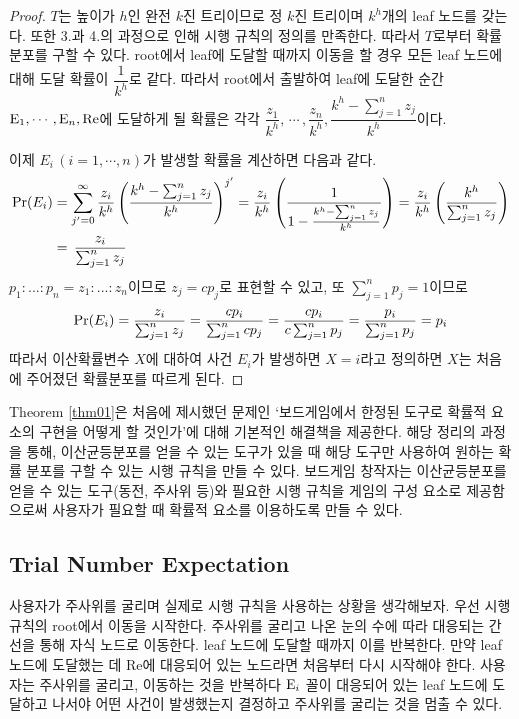 \documentclass[11pt]{article}
\begin{document}
\doublespacing
\begin{proof}
$T$는 높이가 $h$인 완전 $k$진 트리이므로 정 $k$진 트리이며 $k^{h}$개의 leaf 노드를 갖는다. 또한 3.과 4.의 과정으로 인해 시행 규칙의 정의를 만족한다. 따라서 $T$로부터 확률분포를 구할 수 있다. root에서 leaf에 도달할 때까지 이동을 할 경우 모든 leaf 노드에 대해 도달 확률이 $\dfrac{1}{k^{h}}$로 같다. 따라서 root에서 출발하여 leaf에 도달한 순간 $\textnormal{E}_1,\cdots,\textnormal{E}_n,\textnormal{Re}$에 도달하게 될 확률은 각각 $\dfrac{z_{1}}{k^{h}},\,\cdots\,,\dfrac{z_{n}}{k^{h}},\dfrac{k^{h}-\sum_{j=1}^{n}z_{j}}{k^{h}}$이다.

이제 $E_{i}\,(i=1,\cdots,n)$가 발생할 확률을 계산하면 다음과 같다.
\[
\begin{split}
\textnormal{Pr}(E_{i}) & = \sum_{j'=0}^{\infty} \frac{z_{i}}{k^{h}}\left(\frac{k^{h}-\sum_{j=1}^{n}z_{j}}{k^{h}}\right)^{j'} = \frac{z_{i}}{k^{h}}\left(\frac{1}{1 - \frac{k^{h}-\sum_{j=1}^{n}z_{j}}{k^{h}}}\right) = \frac{z_{i}}{k^{h}}\left(\frac{k^{h}}{\sum_{j=1}^{n}z_{j}}\right)\\
& = \,\frac{z_{i}}{\sum_{j=1}^{n}z_{j}}
\end{split}
\]
$p_{1}:...:p_{n} = z_{1}:...:z_{n}$이므로 $z_{j} = cp_{j}$로 표현할 수 있고, 또 $\sum_{j=1}^{n}p_{j} = 1$이므로
\[\textnormal{Pr}(E_{i}) = \frac{z_{i}}{\sum_{j=1}^{n}z_{j}} = \frac{cp_{i}}{\sum_{j=1}^{n}cp_{j}} = \frac{cp_{i}}{c\sum_{j=1}^{n}p_{j}} = \frac{p_{i}}{\sum_{j=1}^{n}p_{j}} = p_{i}\]
따라서 이산확률변수 $X$에 대하여 사건 $E_{i}$가 발생하면 $X = i$라고 정의하면 $X$는 처음에 주어졌던 확률분포를 따르게 된다.
\end{proof}

Theorem \ref{thm01}은 처음에 제시했던 문제인 `보드게임에서 한정된 도구로 확률적 요소의 구현을 어떻게 할 것인가'에 대해 기본적인 해결책을 제공한다. 해당 정리의 과정을 통해, 이산균등분포를 얻을 수 있는 도구가 있을 때 해당 도구만 사용하여 원하는 확률 분포를 구할 수 있는 시행 규칙을 만들 수 있다. 보드게임 창작자는 이산균등분포를 얻을 수 있는 도구(동전, 주사위 등)와 필요한 시행 규칙을 게임의 구성 요소로 제공함으로써 사용자가 필요할 때 확률적 요소를 이용하도록 만들 수 있다.

\subsection{Trial Number Expectation}
사용자가 주사위를 굴리며 실제로 시행 규칙을 사용하는 상황을 생각해보자. 우선 시행 규칙의 root에서 이동을 시작한다. 주사위를 굴리고 나온 눈의 수에 따라 대응되는 간선을 통해 자식 노드로 이동한다. leaf 노드에 도달할 때까지 이를 반복한다. 만약 leaf 노드에 도달했는 데 Re에 대응되어 있는 노드라면 처음부터 다시 시작해야 한다. 사용자는 주사위를 굴리고, 이동하는 것을 반복하다 $\textnormal{E}_{i}$ 꼴이 대응되어 있는 leaf 노드에 도달하고 나서야 어떤 사건이 발생했는지 결정하고 주사위를 굴리는 것을 멈출 수 있다. 
\end{document}
